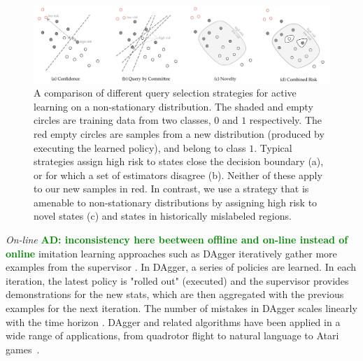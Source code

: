 \documentclass[10pt, conference]{ieeeconf}      %
\newcommand{\adnote}[1]{\ifthenelse{\boolean{include-notes}}%
 {\textcolor{green}{\textbf{AD: #1}}}{}}
\begin{document}
\begin{figure}[t]
\centering

\includegraphics[width=\textwidth]{figures/active_learning.pdf}

\caption{A comparison of different query selection strategies for active learning on a non-stationary distribution. The shaded and empty circles are training data from two classes, $0$ and $1$ respectively. The red empty circles are samples from a new distribution (produced by executing the learned policy), and belong to class $1$. Typical strategies assign high risk to states close the decision boundary (a), or for which a set of estimators disagree (b). Neither of these apply to our new samples in red. In contrast, we use a strategy that is amenable to non-stationary distributions by assigning high risk to novel states (c) and states in historically mislabeled regions. 
}
\label{fig:support_example}
\end{figure}

\emph{On-line}\adnote{inconsistency here beetween offline and on-line instead of online} imitation learning approaches such as DAgger iteratively gather more examples from the supervisor \cite{grollman2007dogged,ross2010efficient,ross2010reduction}. In DAgger, a series of policies are learned.  In each iteration, the latest policy is "rolled out" (executed) and the supervisor provides demonstrations for the  new stats, which are then aggregated with the previous examples for the next iteration. The number of mistakes in DAgger scales linearly with the time horizon \cite{ross2010efficient}. DAgger and related algorithms have been applied in a wide range of applications, from quadrotor flight to natural language to Atari games~\cite{NIPS2014_5421,duvallet2013imitation,ross2013learning}.
\end{document}
